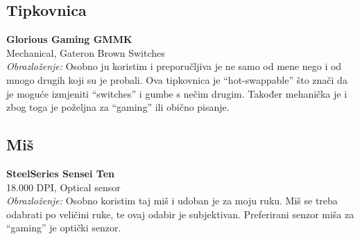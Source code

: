 \documentclass{article}
\begin{document}
\pagebreak

\subsection*{Tipkovnica}
\textbf{Glorious Gaming GMMK } \\
Mechanical, Gateron Brown Switches \\
\textit{Obrazloženje:} Osobno ju koristim i preporučljiva je ne samo od mene nego i od mnogo drugih koji su je probali. Ova tipkovnica je “hot-swappable” što znači da je moguće izmjeniti “switches” i gumbe s nečim drugim. Također mehanička je i zbog toga je poželjna za “gaming” ili obično pisanje.

\subsection*{Miš}
\textbf{SteelSeries Sensei Ten} \\
18.000 DPI, Optical sensor \\
\textit{Obrazloženje:} Osobno koristim taj miš i udoban je za moju ruku. Miš se treba odabrati po veličini ruke, te ovaj odabir je subjektivan. Preferirani senzor miša za “gaming” je optički senzor.
\end{document}
